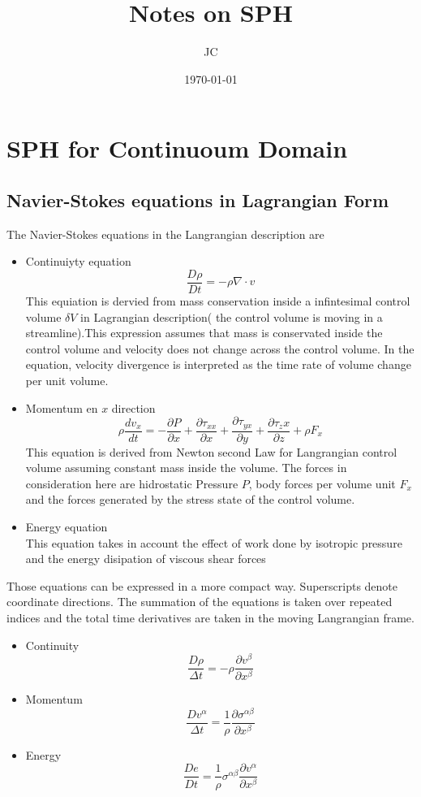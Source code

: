 \documentclass[10pt, twocolumn]{thesis}
\title{Notes on SPH}
\author{JC}
\date{\today}
\begin{document}
\maketitle
\tableofcontents
\part{SPH for Continuoum Domain}

\chapter{Navier-Stokes equations in Lagrangian Form} 
The Navier-Stokes equations in the Langrangian description are\cite{Liu_SPH}
\begin{itemize}
\item Continuiyty equation
\[\frac{D\rho}{Dt}=-\rho\nabla\cdot v\]
This equiation is dervied from mass conservation inside a infintesimal control volume $\delta V$ in Lagrangian description( the control volume is moving in a streamline).This expression assumes that mass is conservated inside the control volume and velocity does not change across the control volume. In the equation, velocity divergence is interpreted as the time rate of volume change per unit volume.
\item Momentum en $x$ direction
\[\rho\frac{dv_x}{dt}=-\frac{\partial P}{\partial x} + \frac{\partial \tau_{xx}}{\partial x} + \frac{\partial \tau_{yx}}{\partial y} + \frac{\partial \tau_{z}x}{\partial z} + \rho F_x\]
This equation is derived from Newton second Law for Langrangian control volume assuming constant mass inside the volume. The forces in consideration here are hidrostatic Pressure $P$, body forces per volume unit $F_x$ and the forces generated by the stress state of the control volume.
\item Energy equation\\
This equation takes in account the effect of work done by isotropic pressure and the energy disipation of viscous shear forces\\
\end{itemize}
Those equations can be expressed in a more compact way. Superscripts denote coordinate directions. The summation of the equations is taken over repeated indices and the total time derivatives are taken in the moving Langrangian frame.
\begin{itemize}
\item Continuity
\[\frac{D\rho}{\Delta t} = -\rho\frac{\partial v^\beta}{\partial x^\beta}\]
\item Momentum
\[\frac{Dv^\alpha}{\Delta t} = \frac{1}{\rho}\frac{\partial\sigma^{\alpha\beta}}{\partial x^{\beta}}\]
\item Energy
\[\frac{De}{Dt}=\frac{1}{\rho}\sigma^{\alpha\beta}\frac{\partial v^\alpha}{\partial x^\beta}\]
\end{itemize}
\end{document}
